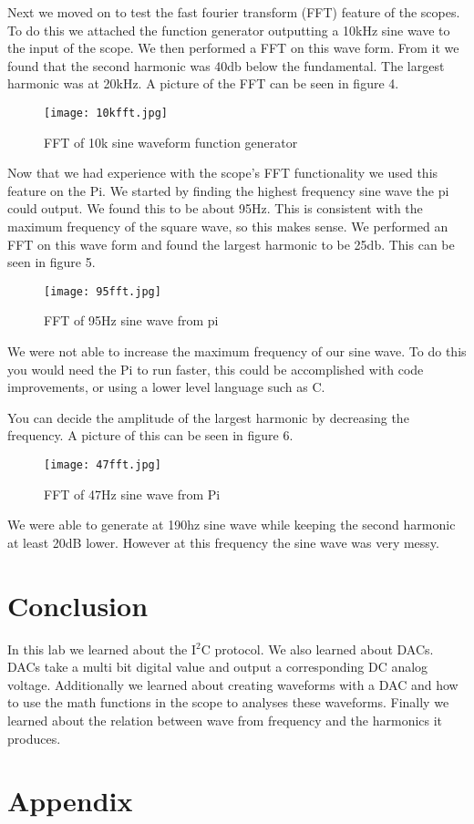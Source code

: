 \documentclass[prl,12pt,notitlepage,aps,onecolumn,superscriptaddress]{revtex4-1}
\begin{document}
Next we moved on to test the fast fourier transform (FFT) feature of the scopes. To do this we attached the function generator outputting a 10kHz sine wave to the input of the scope. We then performed a FFT on this wave form. From it we found that the second harmonic was 40db below the fundamental. The largest harmonic was at 20kHz. A picture of the FFT can be seen in figure 4.

\begin{figure}[h]
\begin{center}
\texttt{[image: 10kfft.jpg]}
\end{center}
\caption{\label{fig:pic} FFT of 10k sine waveform function generator}
\end{figure}

Now that we had experience with the scope's FFT functionality we used this feature on the Pi. We started by finding the highest frequency sine wave the pi could output. We found this to be about 95Hz. This is consistent with the maximum frequency of the square wave, so this makes sense. We performed an FFT on this wave form and found the largest harmonic to be 25db. This can be seen in figure 5.

\begin{figure}[h]
\begin{center}
\texttt{[image: 95fft.jpg]}
\end{center}
\caption{\label{fig:pic} FFT of 95Hz sine wave from pi}
\end{figure}

We were not able to increase the maximum frequency of our sine wave. To do this you would need the Pi to run faster, this could be accomplished with code improvements, or using a lower level language such as C.

You can decide the amplitude of the largest harmonic by decreasing the frequency. A picture of this can be seen in figure 6.

\begin{figure}[h]
\begin{center}
\texttt{[image: 47fft.jpg]}
\end{center}
\caption{\label{fig:pic} FFT of 47Hz sine wave from Pi}
\end{figure}

We were able to generate at 190hz sine wave while keeping the second harmonic at least 20dB lower. However at this frequency the sine wave was very messy.

\section{Conclusion}
In this lab we learned about the I$^2$C protocol. We also learned about DACs. DACs take a multi bit digital value and output a corresponding DC analog voltage. Additionally we learned about creating waveforms with a DAC and how to use the math functions in the scope to analyses these waveforms. Finally we learned about the relation between wave from frequency and the harmonics it produces.

\section{Appendix}




\end{document}
